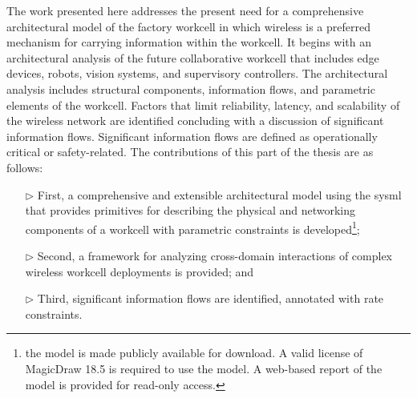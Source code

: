 The work presented here addresses the present need for a comprehensive architectural model of the factory workcell in which wireless is a preferred mechanism for carrying information within the workcell. It begins with an architectural analysis of the future collaborative workcell that includes edge devices, robots, vision systems, and supervisory controllers. The architectural analysis includes structural components, information flows, and parametric elements of the workcell. Factors that limit reliability, latency, and scalability of the wireless network are identified concluding with a discussion of significant information flows. Significant information flows are defined as operationally critical or safety-related.  The contributions of this part of the thesis are as follows:

\begin{itemize}
	\item[$\rhd$] First, a comprehensive and extensible architectural model using the \gls{sysml} that provides primitives for describing the physical and networking components of a workcell with parametric constraints is developed\footnote{the model is made publicly available for download. A valid license of MagicDraw 18.5 is required to use the model.  A web-based report of the model is provided for read-only access.};
	\item[$\rhd$] Second, a framework for analyzing cross-domain interactions of complex wireless workcell deployments is provided; and
	\item[$\rhd$] Third, significant information flows are identified, annotated with rate constraints.
\end{itemize}


